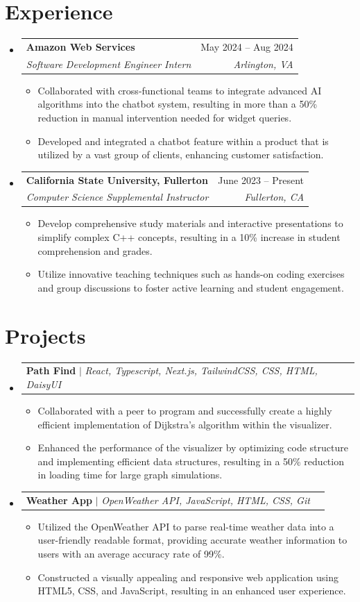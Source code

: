 \documentclass[letterpaper,11pt]{article}
\makeatletter
\newcommand{\resumeItem}[1]{
  \item\small{
    {#1 \vspace{-2pt}}
  }
}
\newcommand{\resumeSubheading}[4]{
  \vspace{-2pt}\item
    \begin{tabular*}{0.97\textwidth}[t]{l@{\extracolsep{\fill}}r}
      \textbf{#1} & #2 \\
      \textit{\small#3} & \textit{\small #4} \\
    \end{tabular*}\vspace{-7pt}
}
\newcommand{\resumeSubSubheading}[2]{
    \item
    \begin{tabular*}{0.97\textwidth}{l@{\extracolsep{\fill}}r}
      \textit{\small#1} & \textit{\small #2} \\
    \end{tabular*}\vspace{-7pt}
}
\newcommand{\resumeProjectHeading}[2]{
    \item
    \begin{tabular*}{0.97\textwidth}{l@{\extracolsep{\fill}}r}
      \small#1 & #2 \\
    \end{tabular*}\vspace{-7pt}
}
\newcommand{\resumeSubHeadingListStart}{\begin{itemize}[leftmargin=0.15in, label={}]}
\newcommand{\resumeSubHeadingListEnd}{\end{itemize}}
\newcommand{\resumeItemListStart}{\begin{itemize}}
\newcommand{\resumeItemListEnd}{\end{itemize}\vspace{-5pt}}
\makeatother
\begin{document}
  \section{Experience}
  \resumeSubHeadingListStart
  \resumeSubheading
  {Amazon Web Services}{May 2024 -- Aug 2024}
  {Software Development Engineer Intern}{Arlington, VA}
  \resumeItemListStart
  \resumeItem{Collaborated with cross-functional teams to integrate advanced AI algorithms into the chatbot system, resulting in more than a 50\% reduction in manual intervention needed for widget queries.}
  \resumeItem{Developed and integrated a chatbot feature within a product that is utilized by a vast group of clients, enhancing customer satisfaction.}
  \resumeItemListEnd
  \resumeSubheading
  {California State University, Fullerton}{June 2023 -- Present}
  {Computer Science Supplemental Instructor}{Fullerton, CA}
  \resumeItemListStart
  \resumeItem{Develop comprehensive study materials and interactive presentations to simplify complex C++ concepts, resulting in a 10\% increase in student comprehension and grades.}
  \resumeItem{Utilize innovative teaching techniques such as hands-on coding exercises and group discussions to foster active learning and student engagement.}
  \resumeItemListEnd
  \resumeSubHeadingListEnd
  \section{Projects}
  \resumeSubHeadingListStart
  \resumeProjectHeading
  {\textbf{Path Find} $|$ \emph{React, Typescript, Next.js, TailwindCSS, CSS, HTML, DaisyUI}}{}
  \resumeItemListStart
  \resumeItem{Collaborated with a peer to program and successfully create a highly efficient implementation of Dijkstra's algorithm within the visualizer.}
  \resumeItem{Enhanced the performance of the visualizer by optimizing code structure and implementing efficient data structures, resulting in a 50\% reduction in loading time for large graph simulations.}
  \resumeItemListEnd
  \resumeProjectHeading
  {\textbf{Weather App} $|$ \emph{OpenWeather API, JavaScript, HTML, CSS, Git}}{}
  \resumeItemListStart
  \resumeItem{Utilized the OpenWeather API to parse real-time weather data into a user-friendly readable format, providing accurate weather information to users with an average accuracy rate of 99\%.}
  \resumeItem{Constructed a visually appealing and responsive web application using HTML5, CSS, and JavaScript, resulting in an enhanced user experience.}
  \resumeItemListEnd
  \resumeSubHeadingListEnd
  
\end{document}

